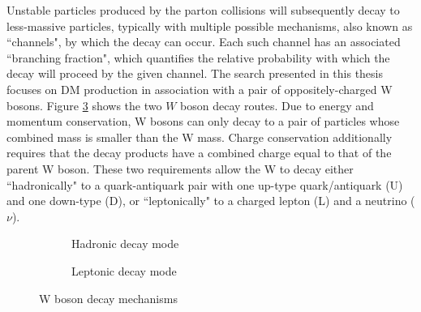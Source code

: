 Unstable particles produced by the parton collisions will subsequently decay to less-massive particles, typically with multiple possible mechanisms, also known as ``channels", by which the decay can occur. Each such channel has an associated ``branching fraction", which quantifies the relative probability with which the decay will proceed by the given channel. The search presented in this thesis focuses on DM production in association with a pair of oppositely-charged W bosons. Figure \ref{fig:W_decays} shows the two $W$ boson decay routes. Due to energy and momentum conservation, W bosons can only decay to a pair of particles whose combined mass is smaller than the W mass. Charge conservation additionally requires that the decay products have a combined charge equal to that of the parent W boson. These two requirements allow the W to decay either ``hadronically" to a quark-antiquark pair with one up-type quark/antiquark (U) and one down-type (D), or ``leptonically" to a charged lepton (L) and a neutrino ($\nu$).


\begin{figure}[H]
	\centering
	\begin{subfigure}[b]{0.49\textwidth}
	\centering
	\caption{Hadronic decay mode}
	\label{fig:W_decays_had}
	\end{subfigure}
	\begin{subfigure}[b]{0.49\textwidth}
	\centering
	\caption{Leptonic decay mode}
	\label{fig:W_decays_lep}
	\end{subfigure}
	\caption[]{W boson decay mechanisms}
	\label{fig:W_decays}
\end{figure}


